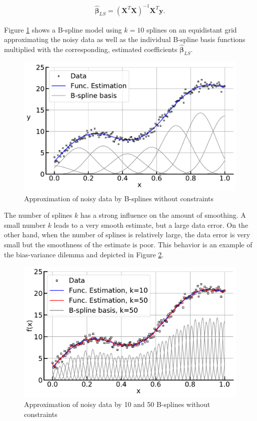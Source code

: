 \documentclass[10pt,a4paper]{article}
\begin{document}
	\begin{align} \label{eq:LS_coef}
		\boldsymbol{\hat \beta}_{LS}= (\boldsymbol{X}^T \boldsymbol{X})^{-1} \boldsymbol{X}^T \boldsymbol{y}.
	\end{align} 
	
	
	Figure \ref{fig:smooth_bf} shows a B-spline model using $k=10$ splines on an equidistant grid approximating the noisy data as well as the individual B-spline basis functions multiplied with the corresponding, estimated coefficients $\boldsymbol{\hat \beta}_{LS}$.
	
	\begin{figure}[H]
		\centering
		\includegraphics[width=\columnwidth]{../thesisplots/smooth_bf.pdf}
		\caption{Approximation of noisy data by B-splines without constraints}
		\label{fig:smooth_bf}
    \end{figure}
	
	
	The number of splines $k$ has a strong influence on the amount of smoothing. A small number $k$ leads to a very smooth estimate, but a large data error. On the other hand, when the number of splines is relatively large, the data error is very small but the smoothness of the estimate is poor. This behavior is an example of the bias-variance dilemma and depicted in Figure \ref{fig:smooth_bf_large}. \cite{sammut2011}


	\begin{figure}[H]
	\centering
	\includegraphics[width=\linewidth]{../thesisplots/smooth_wiggly_bf.pdf}
	\caption{Approximation of noisy data by 10 and 50 B-splines without constraints}
	\label{fig:smooth_bf_large}
	\end{figure}
\end{document}
